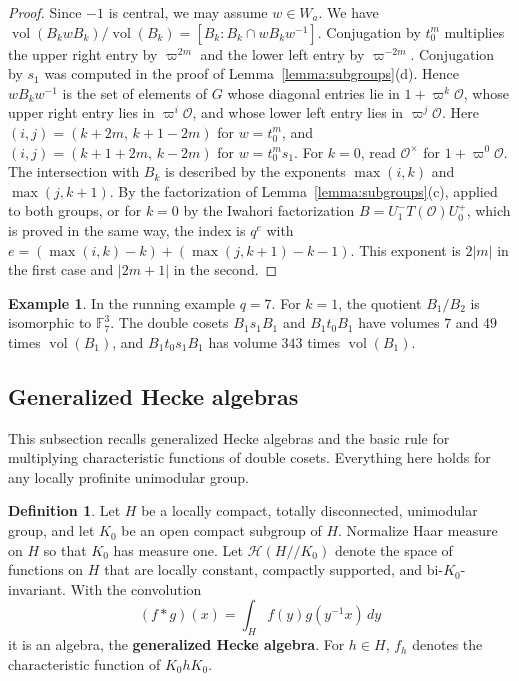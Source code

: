 \documentclass[12pt,letterpaper]{amsart}
\numberwithin{equation}{section}
\theoremstyle{definition}
\newtheorem{definition}[theorem]{Definition}
\newtheorem{example}[theorem]{Example}
\theoremstyle{remark}
\DeclareMathOperator{\vol}{vol}
\newcommand{\cO}{\mathcal{O}}
\newcommand{\cH}{\mathcal{H}}
\begin{document}
\begin{proof}
Since $-1$ is central, we may assume $w\in W_a$. We have
$\vol(B_kwB_k)/\vol(B_k)=[B_k:B_k\cap wB_kw^{-1}]$. Conjugation by
$t_0^m$ multiplies the upper right entry by $\varpi^{2m}$ and the lower
left entry by $\varpi^{-2m}$. Conjugation by $s_1$ was computed in the
proof of Lemma~\ref{lemma:subgroups}(d). Hence $wB_kw^{-1}$ is the set
of elements of $G$ whose diagonal entries lie in $1+\varpi^k\cO$, whose
upper right entry lies in $\varpi^i\cO$, and whose lower left entry
lies in $\varpi^j\cO$. Here $(i,j)=(k+2m,\,k+1-2m)$ for $w=t_0^m$, and
$(i,j)=(k+1+2m,\,k-2m)$ for $w=t_0^ms_1$. For $k=0$, read $\cO^\times$ for $1+\varpi^0\cO$. The intersection
with $B_k$ is described by the exponents $\max(i,k)$ and
$\max(j,k+1)$. By the factorization of Lemma~\ref{lemma:subgroups}(c),
applied to both groups, or for $k=0$ by the Iwahori factorization
$B=U^-_1T(\cO)U^+_0$, which is proved in the same way, the index is $q^{e}$ with
$e=(\max(i,k)-k)+(\max(j,k+1)-k-1)$. This exponent is $2|m|$ in the
first case and $|2m+1|$ in the second.
\end{proof}

\begin{example}
\label{ex:subgroups}
In the running example $q=7$. For $k=1$, the quotient $B_1/B_2$ is
isomorphic to $\mathbb{F}_7^3$. The double cosets $B_1s_1B_1$ and
$B_1t_0B_1$ have volumes $7$ and $49$ times $\vol(B_1)$, and
$B_1t_0s_1B_1$ has volume $343$ times $\vol(B_1)$.
\end{example}

\subsection{Generalized Hecke algebras}
This subsection recalls generalized Hecke algebras and the basic rule
for multiplying characteristic functions of double cosets. Everything
here holds for any locally profinite unimodular group.

\begin{definition}
\label{def:1}
Let $H$ be a locally compact, totally disconnected, unimodular group,
and let $K_0$ be an open compact subgroup of $H$. Normalize Haar
measure on $H$ so that $K_0$ has measure one. Let $\cH(H/\!/K_0)$
denote the space of functions on $H$ that are locally constant,
compactly supported, and bi-$K_0$-invariant. With the convolution
\[
(f*g)(x)=\int_H f(y)g(y^{-1}x)\,dy
\]
it is an algebra, the \textbf{generalized Hecke algebra}. For $h\in H$,
$f_h$ denotes the characteristic function of $K_0hK_0$.
\end{definition}
\end{document}
